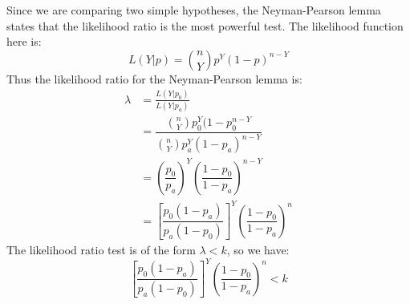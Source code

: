 \documentclass[12pt]{article}
\begin{document}
\begin{enumerate}
Since we are comparing two simple hypotheses, the Neyman-Pearson lemma states that the likelihood ratio is the most powerful test. The likelihood function here is:
\[
L(Y|p) = \binom{n}{Y} p^Y (1-p)^{n-Y}
\]
Thus the likelihood ratio for the Neyman-Pearson lemma is:
\begin{align*}
\lambda &= \frac{L(Y|p_0)}{L(Y|p_a)} \\
&= \dfrac{ \binom{n}{Y} p_0^Y (1-p_0^{n-Y} }{ \binom{n}{Y} p_a^Y (1-p_a)^{n-Y} } \\
&= \left( \dfrac{p_0}{p_a} \right)^Y \left( \dfrac{1 - p_0}{1 - p_a} \right)^{n - Y} \\
&= \left[ \dfrac{p_0(1 - p_a)}{p_a(1 - p_0)} \right]^Y \left( \dfrac{1 - p_0}{1 - p_a} \right)^n
\end{align*}
The likelihood ratio test is of the form $\lambda < k$, so we have:
\[
\left[ \dfrac{p_0(1 - p_a)}{p_a(1 - p_0)} \right]^Y \left( \dfrac{1 - p_0}{1 - p_a} \right)^n < k
\]

\end{enumerate}
\end{document}
